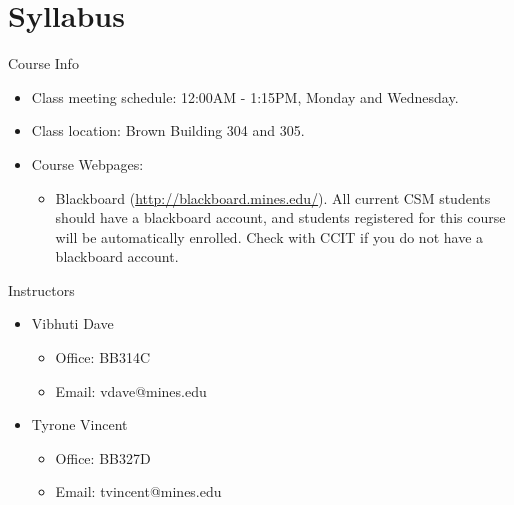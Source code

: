


\section{Syllabus}

\begin{frame}{Course Info}
\begin{itemize}
\item Class meeting schedule: 12:00AM - 1:15PM, Monday and Wednesday. 
\item Class location: Brown Building 304 and 305. 
\item Course Webpages:
\begin{itemize}
\item Blackboard (\url{http://blackboard.mines.edu/}). All current CSM students should have a blackboard account, and students registered for this course will be automatically enrolled. Check with CCIT if you do not have a blackboard account.
\end{itemize}
\end{itemize}
\end{frame}

\begin{frame}{Instructors}
  \begin{itemize}
  \item Vibhuti Dave
  \begin{itemize}
  \item Office: BB314C
  \item Email: vdave@mines.edu
  \end{itemize}
  \item Tyrone Vincent
    \begin{itemize}
  \item Office: BB327D
  \item Email: tvincent@mines.edu
  \end{itemize}
  \end{itemize}
\end{frame}

